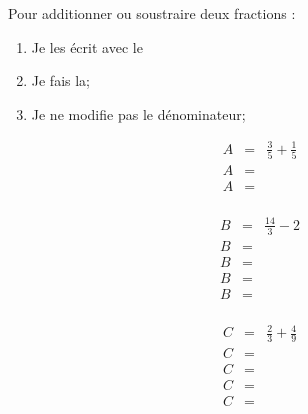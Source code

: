 \begin{mymeth}
	Pour additionner ou soustraire deux fractions :
	
	\begin{enumerate}
		\item Je les écrit avec le 
		\item Je fais la;
		\item Je ne modifie pas le dénominateur;
	\end{enumerate}
\end{mymeth}

\begin{myexs}
	\begin{multicols}{3}
	
	
				\begin{eqnarray*}
					A &=& \frac{3}{5} + \frac{1}{5} \\
					A &=& \\ %
					A &=& \\ %
				\end{eqnarray*}
			
	
			\begin{eqnarray*}
				B &=& \frac{14}{3} - 2 \\
				B &=& \\ %
				B &=& \\ %
				B &=& \\ %
				B &=& \\ %
			\end{eqnarray*}
	
			\begin{eqnarray*}
				C &=& \frac{2}{3} + \frac{4}{9} \\
				C &=& \\ %
				C &=& \\ %
				C &=& \\ %
				C &=& \\ %
			\end{eqnarray*}
	
	\end{multicols}
\end{myexs}